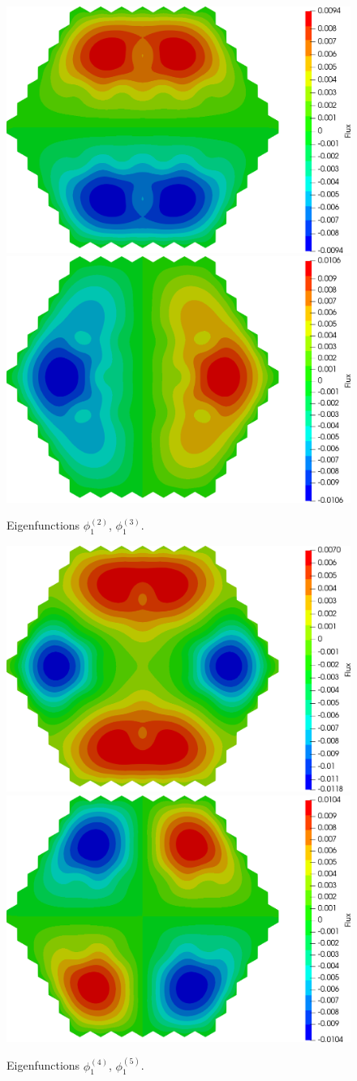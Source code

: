 \documentclass[authoryear]{elsarticle}
\begin{document}
\begin{figure}[h]
\begin{center}
	\includegraphics[width=0.49\linewidth]{iaea_without/alpha_sp3_u1_2_without.png}
	\includegraphics[width=0.49\linewidth]{iaea_without/alpha_sp3_u1_3_without.png}\\
	\caption{Eigenfunctions $\phi_1^{(2)}$, $\phi_1^{(3)}$.}
	\label{fig:iaea_without_fun_2}
\end{center}
\end{figure}

\begin{figure}[h]
\begin{center}
	\includegraphics[width=0.49\linewidth]{iaea_without/alpha_sp3_u1_4_without.png}
	\includegraphics[width=0.49\linewidth]{iaea_without/alpha_sp3_u1_5_without.png}\\
	\caption{Eigenfunctions $\phi_1^{(4)}$, $\phi_1^{(5)}$.}
	\label{fig:iaea_without_fun_3}
\end{center}
\end{figure}
\end{document}

